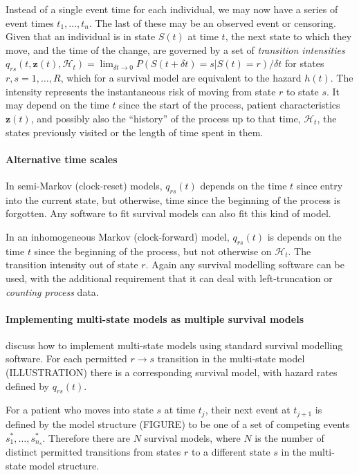 \documentclass[nojss,nofooter]{jss}
\begin{document}
Instead of a single event time for each individual, we may now have a
series of event times $t_{1},\dots, t_{n}$.  The last of these may be
an observed event or censoring.  Given that an individual is in state
$S(t)$ at time $t$, the next state to which they move, and the time of
the change, are governed by a set of \emph{transition intensities}
$q_{rs}(t,\mathbf{z}(t),\mathcal{H}_t) = \lim_{\delta t \rightarrow 0}
P(S(t+\delta t) = s | S(t) = r) / \delta t$ for states $r, s =
1,\dots,R$, which for a survival model are equivalent to the hazard
$h(t)$.  The intensity represents the instantaneous risk of moving
from state $r$ to state $s$.  It may depend on the time $t$ since the
start of the process, patient characteristics $\mathbf{z}(t)$, and
possibly also the ``history'' of the process up to that time,
$\mathcal{H}_t$, the states previously visited or the length of time
spent in them.

\paragraph{Alternative time scales} 

In semi-Markov (clock-reset) models, $q_{rs}(t)$ depends on the time
$t$ since entry into the current state, but otherwise, time since the
beginning of the process is forgotten.  Any software to fit survival
models can also fit this kind of model.  

In an inhomogeneous Markov (clock-forward) model, $q_{rs}(t)$ is
depends on the time $t$ since the beginning of the process, but not
otherwise on $\mathcal{H}_t$.  The transition intensity out of state
$r$.  Again any survival modelling software can be used, with the
additional requirement that it can deal with left-truncation or
\emph{counting process} data.

\paragraph{Implementing multi-state models as multiple survival models}

\citet{putter:mstate} discuss how to implement multi-state models
using standard survival modelling software.  For each permitted $r
\rightarrow s$ transition in the multi-state model (ILLUSTRATION)
there is a corresponding survival model, with hazard rates defined by
$q_{rs}(t)$.

For a patient who moves into state $s$ at time $t_{j}$, their next
event at $t_{j+1}$ is defined by the model structure (FIGURE) to be
one of a set of competing events $s^*_1,\ldots,s^*_{n_s}$.  Therefore
there are $N$ survival models, where $N$ is the number of distinct
permitted transitions from states $r$ to a different state $s$ in the
multi-state model structure.
\end{document}
